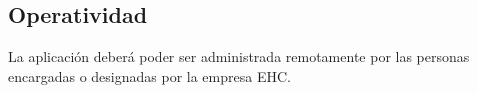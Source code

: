 \subsection{Operatividad}
La aplicaci\'on deber\'a poder ser administrada remotamente por las personas encargadas o designadas por la empresa EHC.